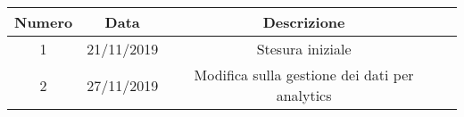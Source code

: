 \begin{tabular}{|c | c | c | c|} 
 	\hline
	 Numero & Data & Descrizione \\ [0.5ex] 
	\hline\hline
	1 & 21/11/2019 & Stesura iniziale \\ 
	\hline
	2 & 27/11/2019 & Modifica sulla gestione dei dati per analytics \\
	\hline
\end{tabular}